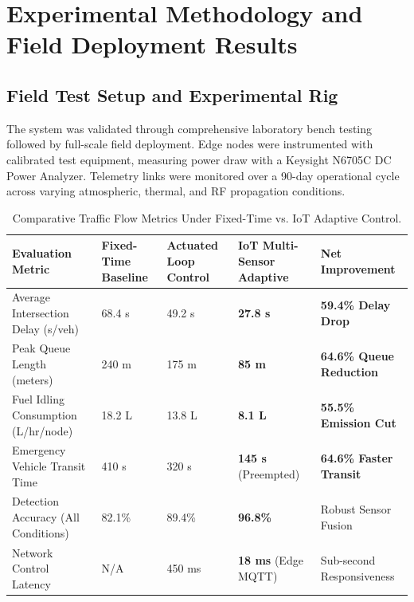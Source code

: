 \section{Experimental Methodology and Field Deployment Results}

\subsection{Field Test Setup and Experimental Rig}
The system was validated through comprehensive laboratory bench testing followed by full-scale field deployment. Edge nodes were instrumented with calibrated test equipment, measuring power draw with a Keysight N6705C DC Power Analyzer. Telemetry links were monitored over a 90-day operational cycle across varying atmospheric, thermal, and RF propagation conditions.

\begin{table}[H]
\centering
\caption{Comparative Traffic Flow Metrics Under Fixed-Time vs. IoT Adaptive Control.}
\label{tab:iot_comp}
\begin{tabularx}{\linewidth}{lXXXX}
\toprule
\textbf{Evaluation Metric} & \textbf{Fixed-Time Baseline} & \textbf{Actuated Loop Control} & \textbf{IoT Multi-Sensor Adaptive} & \textbf{Net Improvement} \\
\midrule
Average Intersection Delay (s/veh) & 68.4 s & 49.2 s & \textbf{27.8 s} & \textbf{59.4\% Delay Drop} \\
Peak Queue Length (meters) & 240 m & 175 m & \textbf{85 m} & \textbf{64.6\% Queue Reduction} \\
Fuel Idling Consumption (L/hr/node) & 18.2 L & 13.8 L & \textbf{8.1 L} & \textbf{55.5\% Emission Cut} \\
Emergency Vehicle Transit Time & 410 s & 320 s & \textbf{145 s} (Preempted) & \textbf{64.6\% Faster Transit} \\
Detection Accuracy (All Conditions) & 82.1\% & 89.4\% & \textbf{96.8\%} & Robust Sensor Fusion \\
Network Control Latency & N/A & 450 ms & \textbf{18 ms} (Edge MQTT) & Sub-second Responsiveness \\
\bottomrule
\end{tabularx}
\end{table}

